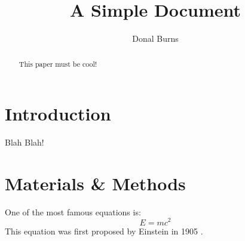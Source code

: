 \documentclass[12pt]{article}
\title{A Simple Document}
\author{Donal Burns}
\date{}
\begin{document}
  \maketitle
  
  \begin{abstract}
    This paper must be cool!
  \end{abstract}
  
  \section{Introduction}
    Blah Blah!
  
  \section{Materials \& Methods}
  One of the most famous equations is:
  \begin{equation}
    E = mc^2
  \end{equation}
  This equation was first proposed by Einstein in 1905 
  \cite{einstein1905does}.
  
  
  
\end{document}
